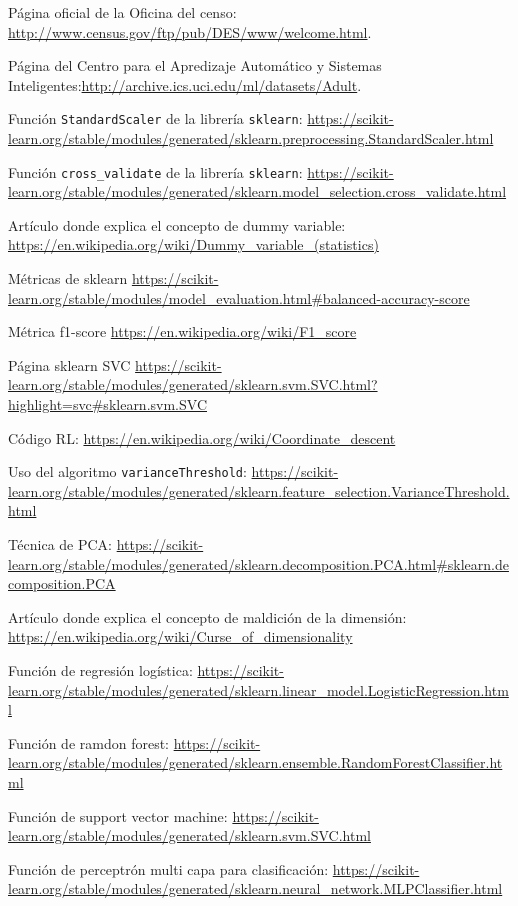 \documentclass[11pt,a4paper]{article}
\begin{document}
\newpage
\begin{thebibliography}{9}
Página oficial de la Oficina del censo: \url{http://www.census.gov/ftp/pub/DES/www/welcome.html}.

Página del Centro para el Apredizaje Automático y Sistemas Inteligentes:\url{http://archive.ics.uci.edu/ml/datasets/Adult}.

Función \texttt{StandardScaler} de la librería \texttt{sklearn}: \url{https://scikit-learn.org/stable/modules/generated/sklearn.preprocessing.StandardScaler.html}

Función \texttt{cross\_validate} de la librería \texttt{sklearn}:
\url{https://scikit-learn.org/stable/modules/generated/sklearn.model_selection.cross_validate.html}

Artículo donde explica el concepto de dummy variable: \url{https://en.wikipedia.org/wiki/Dummy_variable_(statistics)}

Métricas de sklearn \url{https://scikit-learn.org/stable/modules/model_evaluation.html#balanced-accuracy-score}


Métrica f1-score \url{https://en.wikipedia.org/wiki/F1_score}


Página sklearn SVC \url{https://scikit-learn.org/stable/modules/generated/sklearn.svm.SVC.html?highlight=svc#sklearn.svm.SVC}

Código RL: \url{https://en.wikipedia.org/wiki/Coordinate_descent}


Uso del algoritmo \texttt{varianceThreshold}: \url{https://scikit-learn.org/stable/modules/generated/sklearn.feature_selection.VarianceThreshold.html}

Técnica de PCA: 
\url{https://scikit-learn.org/stable/modules/generated/sklearn.decomposition.PCA.html#sklearn.decomposition.PCA}

Artículo donde explica el concepto de maldición de la dimensión: \url{https://en.wikipedia.org/wiki/Curse_of_dimensionality}

Función de regresión logística:
\url{https://scikit-learn.org/stable/modules/generated/sklearn.linear_model.LogisticRegression.html}

Función de ramdon forest:
\url{https://scikit-learn.org/stable/modules/generated/sklearn.ensemble.RandomForestClassifier.html}

Función de support vector machine:
\url{https://scikit-learn.org/stable/modules/generated/sklearn.svm.SVC.html}

Función de perceptrón multi capa para clasificación:
\url{https://scikit-learn.org/stable/modules/generated/sklearn.neural_network.MLPClassifier.html}

\end{thebibliography}
\end{document}
